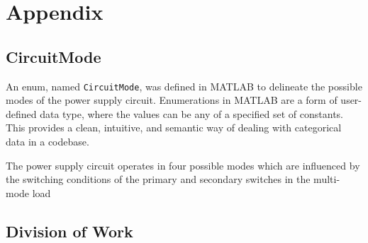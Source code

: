 \section*{Appendix}
\subsection*{CircuitMode}
An enum, named \texttt{CircuitMode}, was defined in MATLAB to delineate the possible modes of the power supply circuit. Enumerations in MATLAB are a form of user-defined data type, where the values can be any of a specified set of constants. This provides a clean, intuitive, and semantic way of dealing with categorical data in a codebase.
\leavevmode\newline

The power supply circuit operates in four possible modes which are influenced by the switching conditions of the primary and secondary switches in the multi-mode load



\subsection*{Division of Work}